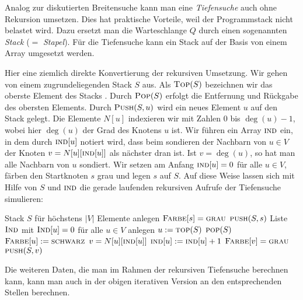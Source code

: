 \begin{bem}
	Analog zur diskutierten Breitensuche kann man eine \emph{Tiefensuche} auch ohne Rekursion umsetzen.
	Dies hat praktische Vorteile, weil der Programmstack nicht  belastet wird.
	Dazu ersetzt man die Warteschlange $Q$ durch einen sogenannten \emph{Stack} ($=$ \emph{Stapel}). Für die Tiefensuche kann ein Stack auf der Basis von einem Array umgesetzt werden. 
	
	Hier eine ziemlich direkte Konvertierung der rekursiven Umsetzung. Wir gehen von einem zugrundeliegenden Stack $S$ aus. Als $\mathop{\text{\textsc{Top}}}(S)$ bezeichnen wir das oberste Element des Stacks . Durch $\mathop{\text{\textsc{Pop}}}(S)$ erfolgt die Entfernung und Rückgabe des obersten Elements. Durch $\mathop{\text{\textsc{Push}}}(S,u)$ wird ein neues Element $u$ auf den Stack gelegt. Die Elemente $N[u]$ indexieren wir mit Zahlen $0$ bis $\deg(u)-1$, wobei hier $\deg(u)$ der Grad des Knotens $u$ ist. Wir führen ein Array $\mathop{\text{\textsc{ind}}}$ ein, in dem durch $\mathop{\text{\textsc{ind}}}[u]$ notiert wird, dass beim sondieren der Nachbarn von $u \in V$  der Knoten $v=N[u][\mathop{\text{\textsc{ind}}}[u]]$ als  nächster dran ist. Ist $v= \deg(u)$, so hat man alle Nachbarn von $u$ sondiert. Wir setzen am Anfang $\mathop{\text{\textsc{ind}}}[u]=0$ für alle $u \in V$, färben den Startknoten $s$ grau und legen $s$ auf $S$. Auf diese Weise lassen sich mit Hilfe von $S$ und $\mathop{\text{\textsc{ind}}}$ die gerade laufenden rekursiven Aufrufe der Tiefensuche simulieren: 
	
	\begin{algorithm}[H]
		\caption{$\cc{Tiefensuche-mit-Stack}(s)$} 
		\begin{algorithmic}[1]
			\STATE Stack $S$ für höchstens $|V|$ Elemente anlegen
			\STATE $\mathop{\text{\textsc{Farbe}}}[s] = \mathop{\text{\textsc{grau}}}$ 
			\STATE $\mathop{\text{\textsc{push}}}(S,s)$
			\STATE Liste $\mathop{\text{\textsc{Ind}}}$  mit $\mathop{\text{\textsc{Ind}}}[u]=0$ für alle $u \in V$ anlegen
			\STATE $u:= \mathop{\text{\textsc{top}}}(S)$ \quad {}
			\STATE $\mathop{\text{\textsc{pop}}}(S)$   \quad {}
			\STATE $\mathop{\text{\textsc{Farbe}}}[u] := \mathop{\text{\textsc{schwarz}}}$
			\ELSE
			\STATE $v=N[u][\mathop{\text{\textsc{ind}}}[u]]$ \quad {} 
			\STATE $\mathop{\text{\textsc{ind}}}[u]:=\mathop{\text{\textsc{ind}}}[u]+1$				
			\STATE $\mathop{\text{\textsc{Farbe}}}[v] = \mathop{\text{\textsc{grau}}}$ \quad {}
			\STATE $\mathop{\text{\textsc{push}}}(S,v)$ \quad {}
			\ENDIF 
			\ENDIF 
			\ENDWHILE  
		\end{algorithmic}
	\end{algorithm}
	
	Die weiteren Daten, die man im Rahmen der rekursiven Tiefensuche berechnen kann, kann man auch in der obigen iterativen Version an den entsprechenden Stellen berechnen. 
\end{bem}




